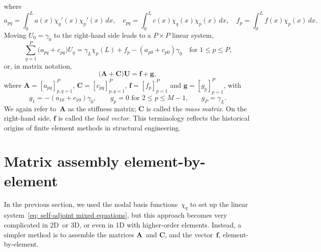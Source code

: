 where
\[
a_{pq}=\int_0^La(x)\chi_q'(x)\chi_p'(x)\,dx,\quad
c_{pq}=\int_0^Lc(x)\chi_q(x)\chi_p(x)\,dx,\quad
f_p=\int_0^Lf(x)\chi_p(x)\,dx.
\]
Moving $U_0=\gamma_0$ to the right-hand side leads to a $P\times P$ linear 
system,
\[
\sum_{q=1}^P\bigl(a_{pq}+c_{pq})U_q
    =\gamma_L\chi_p(L)+f_p-(a_{p0}+c_{p0})\gamma_0
    \quad\text{for $1\le p\le P$,}
\]
or, in matrix notation,
\begin{equation}\label{eq: self-adjoint mixed equations}
\bigl(\boldsymbol{A}+\boldsymbol{C}\bigr)\boldsymbol{U}
    =\boldsymbol{f}+\boldsymbol{g},
\end{equation}
where $\boldsymbol{A}=[a_{pq}]_{p,q=1}^P$, $\boldsymbol{C}=[c_{pq}]_{p,q=1}^P$,
$\boldsymbol{f}=[f_p]_{p=1}^P$ and $\boldsymbol{g}=[g_p]_{p=1}^P$, with
\[
g_1=-(a_{10}+c_{10})\gamma_0,\qquad
\text{$g_p=0$ for $2\le p\le M-1$,}\qquad
g_P=\gamma_L.
\]
We again refer to~$\boldsymbol{A}$ as the stiffness matrix;
$\boldsymbol{C}$ is called the \emph{mass matrix}.  On the right-hand side, 
$\boldsymbol{f}$ is called the \emph{load vector}.  This terminology reflects 
the historical origins of finite element methods in structural engineering.

\section{Matrix assembly element-by-element}\label{sec: matrix assembly 1d}

In the previous section, we used the nodal basis functions~$\chi_q$ to set up 
the linear system~\eqref{eq: self-adjoint mixed equations}, but this approach 
becomes very complicated in 2D~or 3D, or even in 1D with higher-order elements.
Instead, a simpler method is to assemble the matrices $\boldsymbol{A}$~and 
$\boldsymbol{C}$, and the vector~$\boldsymbol{f}$, element-by-element.  


